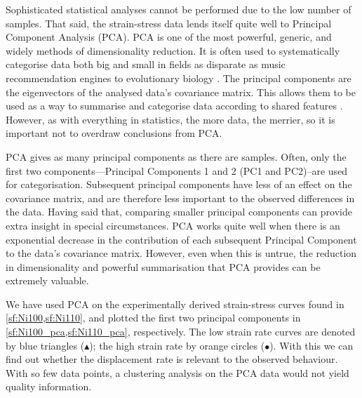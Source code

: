 Sophisticated statistical analyses cannot be performed due to the low number of samples. That said, the strain-stress data lends itself quite well to Principal Component Analysis (PCA). PCA is one of the most powerful, generic, and widely methods of dimensionality reduction. It is often used to systematically categorise data both big and small in fields as disparate as music recommendation engines to evolutionary biology \cite{pcamusic,pcaBio}. The principal components are the eigenvectors of the analysed data's covariance matrix. This allows them to be used as a way to summarise and categorise data according to shared features \cite{pca1}. However, as with everything in statistics, the more data, the merrier, so it is important not to overdraw conclusions from PCA.

PCA gives as many principal components as there are samples. Often, only the first two components---Principal Components 1 and 2 (PC1 and PC2)--are used for categorisation. Subsequent principal components have less of an effect on the covariance matrix, and are therefore less important to the observed differences in the data. Having said that, comparing smaller principal components can provide extra insight in special circumstances. PCA works quite well when there is an exponential decrease in the contribution of each subsequent Principal Component to the data's covariance matrix. However, even when this is untrue, the reduction in dimensionality and powerful summarisation that PCA provides can be extremely valuable.

We have used PCA on the experimentally derived strain-stress curves found in \cref{sf:Ni100,sf:Ni110}, and plotted the first two principal components in \cref{sf:Ni100_pca,sf:Ni110_pca}, respectively. The low strain rate curves are denoted by blue triangles (\textcolor{matlabBlue}{$\blacktriangle$}); the high strain rate by orange circles (\textcolor{matlabOrange}{$\bullet$}). With this we can find out whether the displacement rate is relevant to the observed behaviour. With so few data points, a clustering analysis on the PCA data would not yield quality information.

